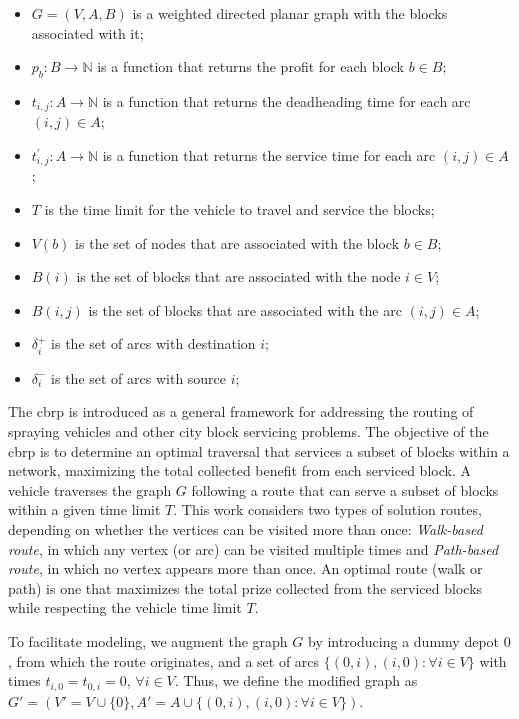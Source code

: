 \begin{itemize}
	\item $G = (V, A, B)$ is a weighted directed planar graph with the blocks associated with it;
	\item $p_b : B \rightarrow \mathbb{N}$ is a function that returns the profit
	      for each block $b \in B$;
	\item $t_{i, j} : A \rightarrow \mathbb{N}$ is a function that returns the
	      deadheading time for each arc $(i, j) \in A$;
	\item $t^{'}_{i, j} : A \rightarrow \mathbb{N}$ is a function that returns
	      the service time for each arc $(i, j) \in A$;
	\item $T$ is the time limit for the vehicle to travel and service the blocks;
	\item $V(b)$ is the set of nodes that are associated with the block $b \in B$;
	\item $B(i)$ is the set of blocks that are associated with the node $i \in V$;
	\item $B(i, j)$ is the set of blocks that are associated with the arc $(i, j) \in A$;
	\item $\delta^{+}_{i}$ is the set of arcs with destination $i$;
	\item $\delta^{-}_{i}$ is the set of arcs with source $i$;
\end{itemize}

The \gls{cbrp} is introduced as a general framework for addressing the routing
of spraying vehicles and other city block servicing problems. The objective of
the \gls{cbrp} is to determine an optimal traversal that services a subset of
blocks within a network, maximizing the total collected benefit from each
serviced block. A vehicle traverses the graph $G$ following a route that can
serve a subset of blocks within a given time limit $T$. This work considers two
types of solution routes, depending on whether the vertices can be visited more
than once: \textit{Walk-based route}, in which any vertex (or arc) can be
visited multiple times and \textit{Path-based route}, in which no vertex appears
more than once. An optimal route (walk or path) is one that maximizes the total
prize collected from the serviced blocks while respecting the vehicle time limit
$T$.

To facilitate modeling, we augment the graph $G$ by introducing a dummy depot
$0$, from which the route originates, and a set of arcs $\{(0, i), (i, 0) :
	\forall i \in V\}$ with times $t_{i,0} = t_{0,i} = 0$, $\forall i \in V$. Thus,
we define the modified graph as $G' = (V' = V \cup \{0\}, A' = A \cup \{(0, i),
	(i, 0) : \forall i \in V\})$.

